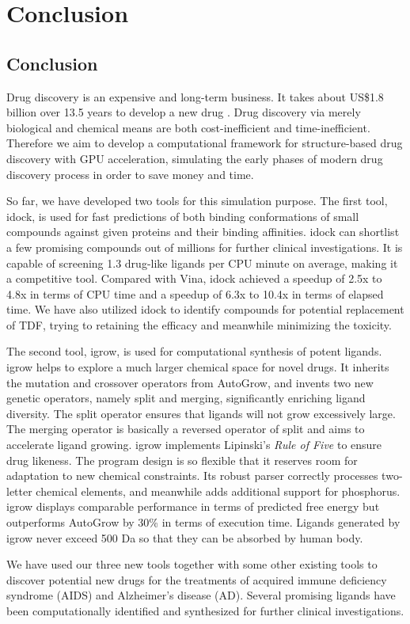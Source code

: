 \chapter{Conclusion}

\section{Conclusion}

Drug discovery is an expensive and long-term business. It takes about US\$1.8 billion over 13.5 years to develop a new drug \citep{716}. Drug discovery via merely biological and chemical means are both cost-inefficient and time-inefficient. Therefore we aim to develop a computational framework for structure-based drug discovery with GPU acceleration, simulating the early phases of modern drug discovery process in order to save money and time.

So far, we have developed two tools for this simulation purpose. The first tool, idock, is used for fast predictions of both binding conformations of small compounds against given proteins and their binding affinities. idock can shortlist a few promising compounds out of millions for further clinical investigations. It is capable of screening 1.3 drug-like ligands per CPU minute on average, making it a competitive tool. Compared with Vina, idock achieved a speedup of 2.5x to 4.8x in terms of CPU time and a speedup of 6.3x to 10.4x in terms of elapsed time. We have also utilized idock to identify compounds for potential replacement of TDF, trying to retaining the efficacy and meanwhile minimizing the toxicity.

The second tool, igrow, is used for computational synthesis of potent ligands. igrow helps to explore a much larger chemical space for novel drugs. It inherits the mutation and crossover operators from AutoGrow, and invents two new genetic operators, namely split and merging, significantly enriching ligand diversity. The split operator ensures that ligands will not grow excessively large. The merging operator is basically a reversed operator of split and aims to accelerate ligand growing. igrow implements Lipinski's \textit{Rule of Five} \citep{168} to ensure drug likeness. The program design is so flexible that it reserves room for adaptation to new chemical constraints. Its robust parser correctly processes two-letter chemical elements, and meanwhile adds additional support for phosphorus. igrow displays comparable performance in terms of predicted free energy but outperforms AutoGrow by 30\% in terms of execution time. Ligands generated by igrow never exceed 500 Da so that they can be absorbed by human body. 

We have used our three new tools together with some other existing tools to discover potential new drugs for the treatments of acquired immune deficiency syndrome (AIDS) and Alzheimer's disease (AD). Several promising ligands have been computationally identified and synthesized for further clinical investigations.

\chapterend
